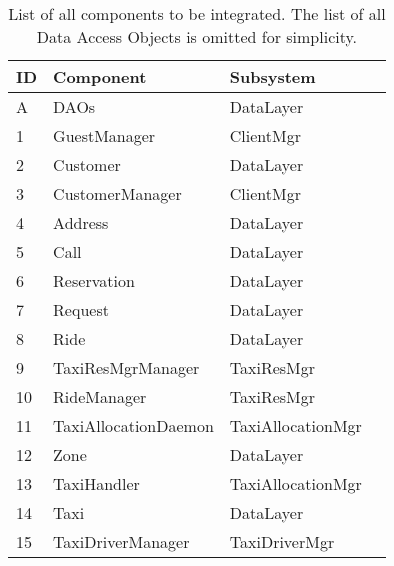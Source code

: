 \begin{table}
    \centering
    \begin{tabular}{| l | l | p{} | p{} |}
    \hline
    \textbf{ID} & \textbf{Component} & \textbf{Subsystem} \\
    \hline
    A & DAOs & DataLayer \\
    \hline
    1 & GuestManager & ClientMgr\\
    \hline
    2 & Customer & DataLayer\\
    \hline
    3 & CustomerManager & ClientMgr\\
    \hline
    4 & Address & DataLayer\\
    \hline
    5 & Call & DataLayer\\
    \hline
    6 & Reservation & DataLayer\\
    \hline
    7 & Request & DataLayer\\
    \hline
    8 & Ride & DataLayer\\
    \hline
    9 & TaxiResMgrManager & TaxiResMgr\\
    \hline
    10 & RideManager & TaxiResMgr\\
    \hline
    11 & TaxiAllocationDaemon & TaxiAllocationMgr\\
    \hline
    12 & Zone & DataLayer\\
    \hline
    13 & TaxiHandler & TaxiAllocationMgr\\
    \hline
    14 & Taxi & DataLayer\\
    \hline
    15 & TaxiDriverManager & TaxiDriverMgr\\
    \hline
    \end{tabular}
    \caption{List of all components to be integrated. The list of all Data Access Objects is omitted for simplicity.}
    \label{tab:components}
\end{table}